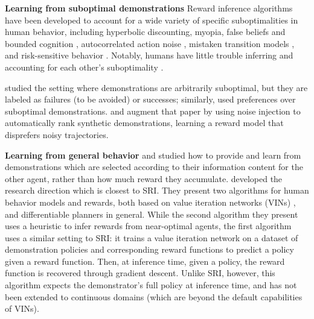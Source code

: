 \textbf{Learning from suboptimal demonstrations} Reward inference algorithms have been developed to account for a wide variety of specific suboptimalities in human behavior, including hyperbolic discounting, myopia, false beliefs and bounded cognition \citep{evans2015learning, evans2016learning, zhi2020online}, autocorrelated action noise \citep{zheng2014robust}, mistaken transition models \citep{reddy2018where}, and risk-sensitive behavior \citep{singh2018risk, ratliff2020inverse}. Notably, humans have little trouble inferring and accounting for each other's suboptimality \citep{evans2016learning, zhi2020online}.

\citet{shiarlis2016inverse} studied the setting where demonstrations are arbitrarily suboptimal, but they are labeled as failures (to be avoided) or successes; similarly, \citet{brown2020safe} used preferences over suboptimal demonstrations. \citet{brown2020better} and \citet{chen2021learning} augment that paper by using noise injection to automatically rank synthetic demonstrations, learning a reward model that disprefers noisy trajectories.



\textbf{Learning from general behavior} \citet{hadfieldmenell2016cooperative} and \citet{malik2018efficient}
studied how to provide and learn from demonstrations which are selected according to their information content for the other agent, rather than how much reward they accumulate. \citet{shah2019feasibility} developed the research direction which is closest to SRI. They present two algorithms for human behavior models and rewards, both based on value iteration networks (VINs) \citep{tamar2016value}, and differentiable planners in general. While the second algorithm they present uses a heuristic to infer rewards from near-optimal agents, the first algorithm uses a similar setting to SRI: it trains a value iteration network on a dataset of demonstration policies and corresponding reward functions to predict a policy given a reward function. Then, at inference time, given a policy, the reward function is recovered through gradient descent. Unlike SRI, however, this algorithm expects the demonstrator's full policy at inference time, and has not been extended to continuous domains (which are beyond the default capabilities of VINs).
